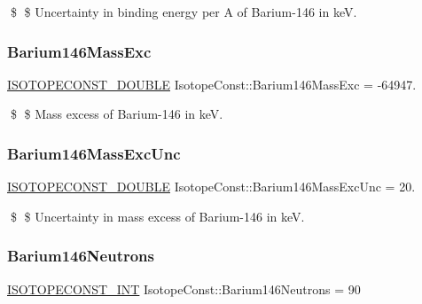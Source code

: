 \$ \$ Uncertainty in binding energy per A of Barium-\/146 in keV. \mbox{\label{group___isotope_const-_barium-_ba146_gab5de4742e3cd258364698309e1bf9b10}} 
\subsubsection{\texorpdfstring{Barium146\+Mass\+Exc}{Barium146MassExc}}
{\footnotesize\ttfamily \mbox{\hyperlink{group___isotope_const-_macros_ga8f45a7272ce02c0b4c65c44636ed719a}{I\+S\+O\+T\+O\+P\+E\+C\+O\+N\+S\+T\+\_\+\+D\+O\+U\+B\+LE}} Isotope\+Const\+::\+Barium146\+Mass\+Exc = -\/64947.}

\$ \$ Mass excess of Barium-\/146 in keV. \mbox{\label{group___isotope_const-_barium-_ba146_gaafa4a40fc67327a2891d6712cd56351c}} 
\subsubsection{\texorpdfstring{Barium146\+Mass\+Exc\+Unc}{Barium146MassExcUnc}}
{\footnotesize\ttfamily \mbox{\hyperlink{group___isotope_const-_macros_ga8f45a7272ce02c0b4c65c44636ed719a}{I\+S\+O\+T\+O\+P\+E\+C\+O\+N\+S\+T\+\_\+\+D\+O\+U\+B\+LE}} Isotope\+Const\+::\+Barium146\+Mass\+Exc\+Unc = 20.}

\$ \$ Uncertainty in mass excess of Barium-\/146 in keV. \mbox{\label{group___isotope_const-_barium-_ba146_ga05ff0990f8e67fd38aeb6ab318a293de}} 
\subsubsection{\texorpdfstring{Barium146\+Neutrons}{Barium146Neutrons}}
{\footnotesize\ttfamily \mbox{\hyperlink{group___isotope_const-_macros_ga5f18360b3e99483a35c32d789e62621c}{I\+S\+O\+T\+O\+P\+E\+C\+O\+N\+S\+T\+\_\+\+I\+NT}} Isotope\+Const\+::\+Barium146\+Neutrons = 90}

